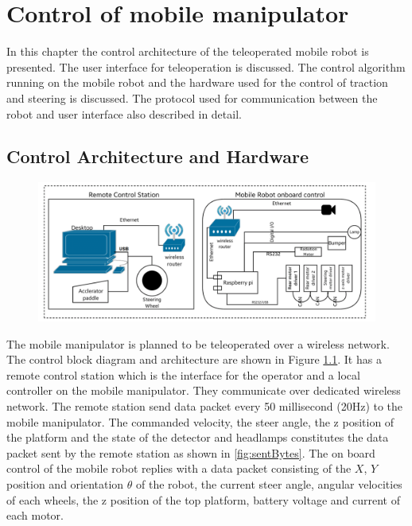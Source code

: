 \chapter{Control of mobile manipulator }
\label{c5_DI2}
In this chapter the control architecture of the teleoperated  mobile robot is presented. The user interface for teleoperation is discussed. The control algorithm  running on the mobile robot and the hardware used for the control of traction and steering is discussed. The protocol used  for communication between the robot and user interface also described in detail.
\section{Control Architecture and Hardware}


\begin{figure}
	\includegraphics[width=\linewidth,keepaspectratio]{Chapter3/fig/controlblock}
	\label{fig:ControlBlockDiag} 
\end{figure} 
The mobile manipulator is planned to be teleoperated over a wireless network. The control block diagram and architecture are shown in Figure \ref{fig:ControlBlockDiag}. It has a remote control station which is the interface for the operator and a local controller on the mobile manipulator. They  communicate over dedicated wireless network. The remote station send data packet every 50 millisecond (20Hz) to the mobile manipulator. The commanded velocity, the steer angle, the z position of the platform and the state of the detector and headlamps constitutes the data packet sent by the remote station as shown in \ref{fig:sentBytes}. The on board control of the mobile robot replies with a data packet consisting of the $X$, $Y$ position and orientation $\theta$ of the robot, the current steer angle, angular velocities of each wheels, the z position of the top platform,  battery voltage  and current of each motor.


